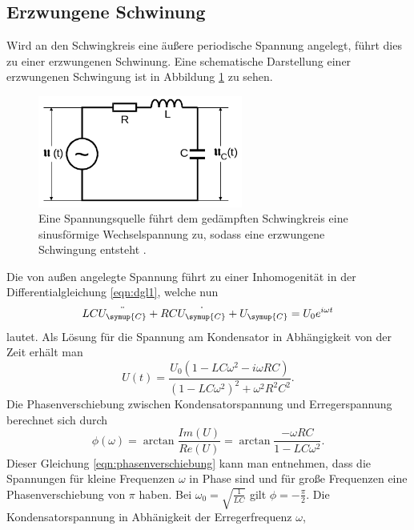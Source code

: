 \subsection{Erzwungene Schwinung}
Wird an den Schwingkreis eine äußere periodische Spannung angelegt, führt dies zu
einer erzwungenen Schwinung. Eine schematische Darstellung einer erzwungenen
Schwingung ist in Abbildung \ref{fig:erz_schwingung} zu sehen.
\begin{figure}
  \centering
  \includegraphics[width=0.6\textwidth]{erzwungene_schwingung.png}
  \caption{Eine Spannungsquelle führt dem gedämpften Schwingkreis eine sinusförmige
  Wechselspannung zu, sodass eine erzwungene Schwingung entsteht \cite{sample}.}
  \label{fig:erz_schwingung}
\end{figure}
Die von außen angelegte Spannung führt zu einer Inhomogenität in der Differentialgleichung
\eqref{eqn:dgl1}, welche nun
\begin{equation}
  L C \ddot{U_\symup{C}} + R C \dot{U_\symup{C}} + U_\symup{C} = U_0 e^{i\omega t}
  \label{eqn:dgl2}
\end{equation}
lautet. Als Lösung für die Spannung am Kondensator in Abhängigkeit von der Zeit
erhält man
\begin{equation}
  U(t) = \frac{U_0 (1 - L C \omega^2 - i \omega R C)}{(1 - L C \omega^2)^2 +
  \omega^2 R^2 C^2}.
  \label{eqn:loesung2}
\end{equation}
Die Phasenverschiebung zwischen Kondensatorspannung und Erregerspannung berechnet
sich durch
\begin{equation}
  \phi(\omega)=\arctan{\frac{Im(U)}{Re(U)}}
  = \arctan{\frac{-\omega R C}{1-L C \omega^2}}.
  \label{eqn:phasenverschiebung}
\end{equation}
Dieser Gleichung \eqref{eqn:phasenverschiebung} kann man entnehmen, dass die
Spannungen für kleine Frequenzen $\omega$ in Phase sind und für große Frequenzen
eine Phasenverschiebung von $\pi$ haben. Bei $\omega_0=\sqrt{\frac{1}{L C}}$ gilt
$\phi = -\frac{\pi}{2}$.\newline
Die Kondensatorspannung in Abhänigkeit der Erregerfrequenz $\omega$,
